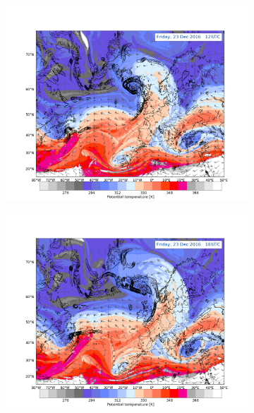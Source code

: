\begin{figure}
	\centering
	\begin{subfigure}[b]{0.49\textwidth}
		\includegraphics[trim={4.2cm 0cm 4.3cm 5.1cm},clip,
		width=\textwidth]{./fig_DynTropo/20161223_12}
		\caption{} \label{fig:DT23}
	\end{subfigure}
	\begin{subfigure}[b]{0.49\textwidth}
		\includegraphics[trim={4.2cm 0cm 4.3cm 5.1cm},clip,
		width=\textwidth]{./fig_DynTropo/20161223_18}
		\caption{} \label{fig:DT23_18}
	\end{subfigure}

\end{figure}

